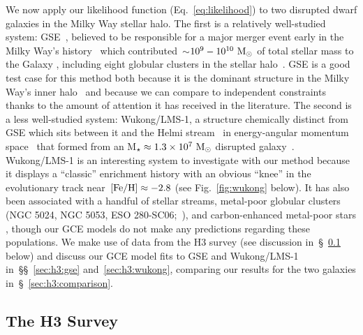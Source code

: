 \documentclass[ms.tex]{subfiles}
\begin{document}
We now apply our likelihood function (Eq.~\ref{eq:likelihood}) to two
disrupted dwarf galaxies in the Milky Way stellar halo.
The first is a relatively well-studied system: GSE~\citep{Belokurov2018,
Helmi2018, Haywood2018, Myeong2018, Mackereth2019}, believed to be responsible
for a major merger event early in the Milky Way's history~\citep{Gallart2019,
Bonaca2020, Chaplin2020, Montalban2021, Xiang2022} which
contributed~$\sim$$10^9 - 10^{10}~\text{M}_\odot$ of total stellar mass to the Galaxy
\citep{Deason2019, Fattahi2019, Mackereth2019, Vincenzo2019, Kruijssen2020,
Han2022}, including eight globular clusters in the stellar
halo~\citep{Myeong2018, Massari2019, Kruijssen2019, Forbes2020}.
GSE is a good test case for this method both because it is the dominant
structure in the Milky Way's inner halo~\citep{Helmi2018} and because we can
compare to independent constraints thanks to the amount of attention it has
received in the literature.
The second is a less well-studied system: Wukong/LMS-1, a structure chemically
distinct from GSE which sits between it and the Helmi stream~\citep{Helmi1999}
in energy-angular momentum space~\citep{Naidu2020, Yuan2020} that
formed from an M$_\star \approx 1.3\times10^{7}~\text{M}_\odot$ disrupted
galaxy~\citep{Naidu2022}.
Wukong/LMS-1 is an interesting system to investigate with our method
because it displays a ``classic'' enrichment history with an obvious ``knee''
in the evolutionary track near~$\text{[Fe/H]} \approx -2.8$ (see Fig.~\ref{fig:wukong}
below).
It has also been associated with a handful of stellar streams, metal-poor
globular clusters (NGC 5024, NGC 5053, ESO 280-SC06;~\citealp{Yuan2020,
Malhan2021, Malhan2022, Naidu2022}), and carbon-enhanced metal-poor stars
\citep{Shank2022}, though our GCE models do not make any predictions regarding
these populations.
We make use of data from the H3 survey (see discussion
in~\S~\ref{sec:h3:survey} below) and discuss our GCE model fits to GSE and
Wukong/LMS-1 in~\S\S~\ref{sec:h3:gse} and~\ref{sec:h3:wukong}, comparing our
results for the two galaxies in~\S~\ref{sec:h3:comparison}.

\subsection{The H3 Survey}
\label{sec:h3:survey}
\end{document}
